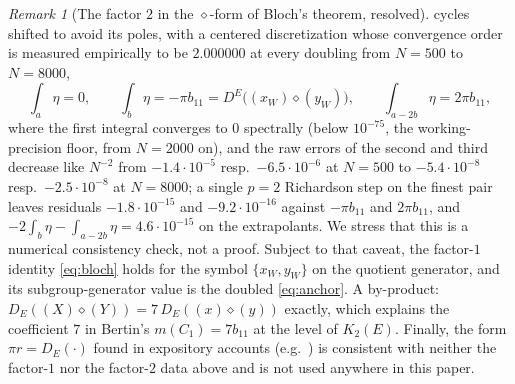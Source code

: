 \documentclass[11pt]{amsart}
\theoremstyle{definition}
\theoremstyle{remark}
\newtheorem{remark}[theorem]{Remark}
\begin{document}
\begin{remark}[The factor $2$ in the $\diamond$-form of Bloch's theorem,
resolved]
cycles shifted to avoid its poles, with a centered discretization whose
convergence order is measured empirically to be $2.000000$ at every
doubling from $N=500$ to $N=8000$,
\[
  \textstyle
  \int_{a}\eta=0,\qquad
  \int_{b}\eta=-\pi b_{11}
   =D^E\bigl((x_W)\diamond(y_W)\bigr),\qquad
  \int_{a-2b}\eta=2\pi b_{11},
\]
where the first integral converges to $0$ spectrally (below $10^{-75}$, the
working-precision floor, from $N=2000$ on), and the raw errors of the
second and third decrease like $N^{-2}$ from $-1.4\cdot10^{-5}$ resp.\
$-6.5\cdot10^{-6}$ at $N=500$ to $-5.4\cdot10^{-8}$ resp.\
$-2.5\cdot10^{-8}$ at $N=8000$; a single $p=2$ Richardson step on the
finest pair leaves residuals $-1.8\cdot10^{-15}$ and $-9.2\cdot10^{-16}$
against $-\pi b_{11}$ and $2\pi b_{11}$, and
$-2\int_b\eta-\int_{a-2b}\eta=4.6\cdot10^{-15}$ on the extrapolants.
We stress that this is a numerical consistency check, not a proof.
Subject to that caveat, the factor-$1$ identity \eqref{eq:bloch} holds for
the symbol
$\{x_W,y_W\}$ on the quotient generator, and its subgroup-generator value is
the doubled \eqref{eq:anchor}.
A by-product: $D_E((X)\diamond(Y))=7\,D_E((x)\diamond(y))$ exactly, which
explains the coefficient $7$ in Bertin's $m(C_1)=7b_{11}$ at the level of
$K_2(E)$. Finally, the form $\pi r=D_E(\cdot)$ found in expository accounts
(e.g.\ \cite[Thm.~1]{Touafek}) is consistent with neither the factor-$1$
nor the factor-$2$ data above and is not used anywhere in this paper.
\end{remark}
\end{document}
